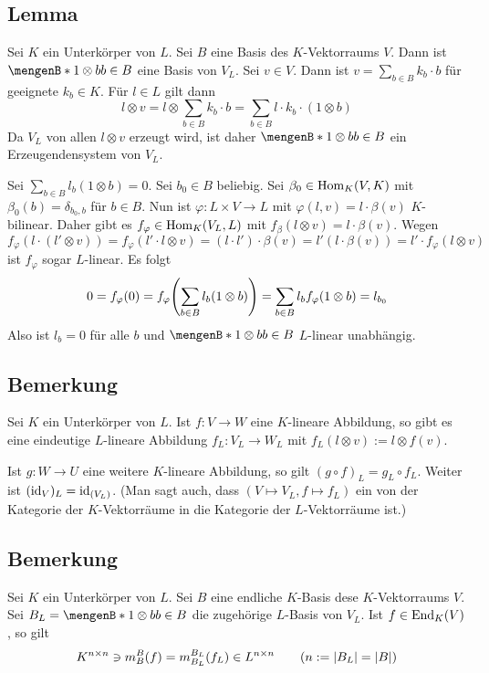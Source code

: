 \subsection[Lemma: Basis von $V_L$]{Lemma} %
\label{sub:1011}
Sei $K$ ein Unterkörper von $L$. Sei $B$ eine Basis des $K$-Vektorraums $V$. Dann ist $\set[1 \otimes b]{b \in B}$ eine Basis von $V_L$.
Sei $v \in V$. Dann ist $v= \sum_{b \in B} k_b \cdot b$ für geeignete $k_b \in K$. Für $l \in L$ gilt dann 
\[
	l \otimes v =  l \otimes \sum_{b \in B} k_b \cdot b = \sum_{b \in B} l \cdot k_b \cdot(1 \otimes b)
\]
Da $V_L$ von allen $l \otimes v$ erzeugt wird, ist daher $\set[1 \otimes b]{b \in B}$ ein 
Erzeugendensystem von $V_L$.

Sei $\sum_{b \in B} l_b (1 \otimes b)=0$. Sei $b_0 \in B$ beliebig. Sei $\beta_0 \in \operatorname{Hom}_K(V,K)$ mit $\beta_0 (b) = \delta_{b_0,b}$ für $b \in B$. Nun ist 
$\varphi : L \times V \to L$ mit $\varphi(l,v)= l \cdot \beta(v)$ $K$-bilinear. Daher gibt es $f_\varphi \in \operatorname{Hom}_K (V_L, L)$ mit 
$f_\beta(l \otimes v) = l \cdot \beta(v)$. Wegen 
\[
	f_\varphi ( l \cdot  ( l' \otimes v)) = f_\varphi( l' \cdot l \otimes v) =  (l \cdot l') \cdot  \beta(v) = l'(l \cdot  \beta(v)) =  l' \cdot   f_\varphi( l \otimes v)
\] 
ist $f_\varphi$ sogar $L$-linear. Es folgt
\[
	0 = f_\varphi (0) = f_\varphi \enbrace*{ \sum_{b \in B} l_b (1 \otimes  b)} = \sum_{b \in B} l_b f_\varphi (1 \otimes b) = l_{b_0} 
\]
Also ist $l_b =0$ für alle $b$ und $\set[1 \otimes b]{b \in B} $ $L$-linear unabhängig. \bewende

\subsection[Bemerkung über $L$-lineare Abbildung von $V_L$ nach $W_L$]{Bemerkung} %
\label{sub:1012}
Sei $K$ ein Unterkörper von $L$. Ist $f : V \to W$ eine $K$-lineare Abbildung, so gibt es eine eindeutige $L$-lineare Abbildung $f_L : V_L \to W_L$ mit
$f_L(l \otimes v) := l \otimes f(v)$. 

Ist $g : W \to U$ eine weitere $K$-lineare Abbildung, so gilt $(g \circ f)_L = g_L \circ f_L$. Weiter ist 
$(\operatorname{id}_V)_L= \operatorname{id}_{(V_L)}$. (Man sagt auch, dass $(V \mapsto V_L, f \mapsto f_L)$ ein  von der Kategorie der $K$-Vektorräume in die Kategorie der $L$-Vektorräume ist.)

\subsection[Bemerkung über Matrizen von $f$ und $f_L$]{Bemerkung} %
\label{sub:1013}
Sei $K$ ein Unterkörper von $L$. Sei $B$ eine endliche $K$-Basis dese $K$-Vektorraums $V$. Sei $B_L = \set[1 \otimes b]{b \in B}$ die zugehörige $L$-Basis von $V_L$.
Ist $f \in \operatorname{End}_K(V)$, so gilt 
\[
	 K^{n \times n} \ni m_B^B(f) = m_{B_L}^{B_L}(f_L) \in L^{n \times n} \tag{$n:= \abs*{B_L}= \abs*{B}$}
\]


